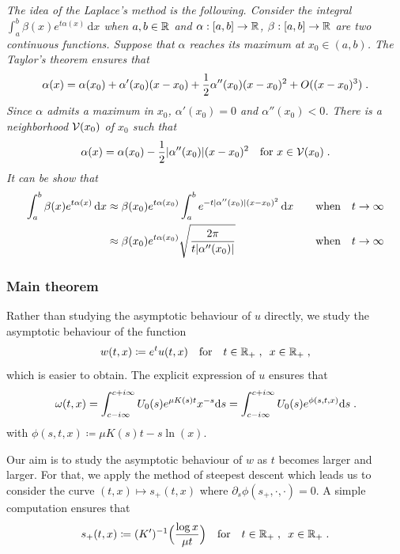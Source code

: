 \documentclass[11pt]{amsart}
\newcommand{\diff}{\,\mathrm{d}}
\begin{document}
        \textit{The idea of the Laplace's method is the following. Consider the integral 
        $\int_a^b \beta(x) e^{t\alpha(x)}\diff x$ when  $a,b \in \mathbb{R}$ and $\alpha : [a,b] \to \mathbb{R}$, $\beta : [a,b] \to \mathbb{R}$ are two continuous functions. Suppose that $\alpha$ reaches its maximum at $x_0 \in (a,b)$. The Taylor's theorem ensures that 
        \begin{align*}
            \alpha(x) = \alpha(x_0) + \alpha'(x_0)(x-x_0) + \frac{1}{2} \alpha''(x_0)(x-x_0)^2 + O((x-x_0)^3)
            \; .
        \end{align*}
        Since $\alpha$ admits a maximum in $x_0$, $\alpha'(x_0) = 0$ and $\alpha''(x_0) < 0$. There is a neighborhood $\mathcal{V}(x_0)$ of $x_0$ such that 
        $$ \alpha(x) = \alpha(x_0) - \frac{1}{2} |\alpha''(x_0)|(x-x_0)^2 \quad \text{for } x \in \mathcal{V}(x_0) \; .$$ 
        It can be show that
        \begin{align*}
        \int_a^b \beta(x) e^{t \alpha(x)}\diff x 
        &\approx  \beta(x_0) e^{t\alpha(x_0)} \int_a^b e^{-t|\alpha''(x_0)|(x-x_0)^2 }\diff x &\mtext{when} t \to \infty\\
        &\approx \beta(x_0) e^{t\alpha(x_0)} \sqrt{\frac{2 \pi}{t |\alpha''(x_0)|}} &\mtext{when} t \to \infty
        \end{align*}}
        
        \subsubsection{Main theorem} 

        Rather than studying the asymptotic behaviour of $u$ directly, we study the asymptotic behaviour of the function 
        \begin{align*}
            w(t,x) \coloneqq e^t u(t,x) 
            \quad \text{for} \quad t \in \mathbb{R}_+ \; , \enspace x \in \mathbb{R}_+
            \; ,
        \end{align*} which is easier to obtain. 
    The explicit expression of $u$ ensures that 
    \begin{equation*}
        \omega(t,x)
        = \int_{c-i\infty}^{c+i\infty} U_0(s) e^{\mu K(s)t}x^{-s} \mathrm ds
        =  \int_{c-i\infty}^{c+i\infty} U_0(s) e^{\phi(s, t, x)} \mathrm ds
        \; .
    \end{equation*}
with $\phi(s,t,x) \coloneqq \mu K(s) t - s \ln(x) $. 

Our aim is to study the asymptotic behaviour of $w$ as $t$ becomes larger and larger. For that, we apply the method of steepest descent which leads us to consider the curve $(t,x) \mapsto s_+(t,x)$ where $\partial_s \phi(s_+, \cdot,\cdot)= 0$. 
A simple computation ensures that
\begin{align*}
    s_+(t,x) \coloneqq (K')^{-1} \Big( \frac{\log x}{\mu t} \Big)
    \quad \text{for} \quad t \in \mathbb{R}_+ \; , \enspace x \in \mathbb{R}_+
    \; .
\end{align*}
\end{document}
